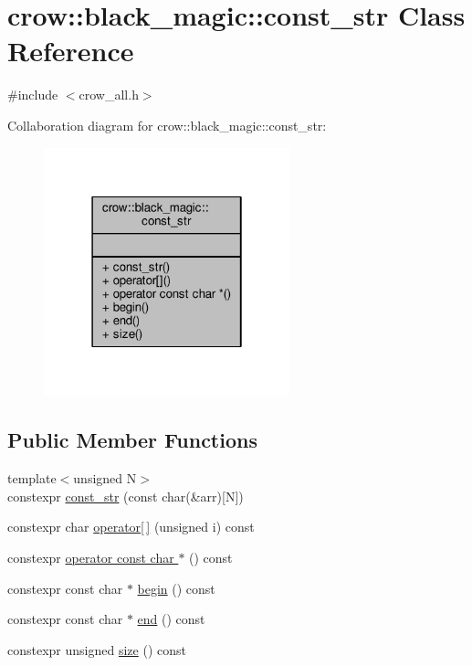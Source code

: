 \hypertarget{classcrow_1_1black__magic_1_1const__str}{\section{crow\-:\-:black\-\_\-magic\-:\-:const\-\_\-str Class Reference}
\label{classcrow_1_1black__magic_1_1const__str}
}


{\ttfamily \#include $<$crow\-\_\-all.\-h$>$}



Collaboration diagram for crow\-:\-:black\-\_\-magic\-:\-:const\-\_\-str\-:
\nopagebreak
\begin{figure}[H]
\begin{center}
\leavevmode
\includegraphics[width=202pt]{classcrow_1_1black__magic_1_1const__str__coll__graph}
\end{center}
\end{figure}
\subsection*{Public Member Functions}
\begin{DoxyCompactItemize}
\item 
{\footnotesize template$<$unsigned N$>$ }\\constexpr \hyperlink{classcrow_1_1black__magic_1_1const__str_a045ea6178ee21e3c7d4cf21fbe0ce929}{const\-\_\-str} (const char(\&arr)\mbox{[}N\mbox{]})
\item 
constexpr char \hyperlink{classcrow_1_1black__magic_1_1const__str_af9b2cd13ef99a977739ad88c6ba3dd6c}{operator\mbox{[}$\,$\mbox{]}} (unsigned i) const 
\item 
constexpr \hyperlink{classcrow_1_1black__magic_1_1const__str_aa71625a38b77026db78a9131088f6d7a}{operator const char $\ast$} () const 
\item 
constexpr const char $\ast$ \hyperlink{classcrow_1_1black__magic_1_1const__str_acf00b402c7212c5285e3bb9e92dcb629}{begin} () const 
\item 
constexpr const char $\ast$ \hyperlink{classcrow_1_1black__magic_1_1const__str_aed3365c7231f991a9974a7a280ec4f33}{end} () const 
\item 
constexpr unsigned \hyperlink{classcrow_1_1black__magic_1_1const__str_add61cd419d28fde6d09d78fab4248063}{size} () const 
\end{DoxyCompactItemize}



